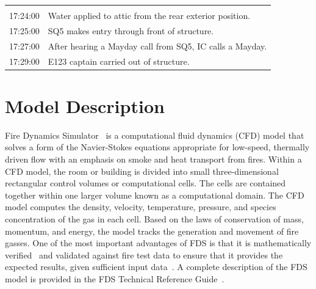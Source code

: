 \documentclass[12pt,oneside]{book}
\begin{document}
\begin{table}
\begin{tabular}{cl}
                           &                                                                                                                                          \\[.25cm]
17:24:00                   &   Water applied to attic from the rear exterior position.                                                                                \\[.25cm]
17:25:00                   &   SQ5 makes entry through front of structure.                                                                                            \\[.25cm]
17:27:00                   &   After hearing a Mayday call from SQ5, IC calls a Mayday.                                                                               \\[.25cm]
17:29:00                   &   E123 captain carried out of structure.                                                                                                 \\
\bottomrule[1.25pt]
\end{tabular}\par
\end{table}
 

\chapter{Model Description}
\label{model}
Fire Dynamics Simulator~\cite{FDS_Users_Guide} is a computational fluid dynamics (CFD) model that solves a form of the Navier-Stokes equations appropriate for low-speed, thermally driven flow with an emphasis on smoke and heat transport from fires.  Within a CFD model, the room or building is divided into small three-dimensional rectangular control volumes or computational cells.  The cells are contained together within one larger volume known as a computational domain.  The CFD model computes the density, velocity, temperature, pressure, and species concentration of the gas in each cell.  Based on the laws of conservation of mass, momentum,  and energy, the model tracks the generation and movement of fire gasses. One of the most important advantages of FDS is that it is  mathematically verified~\cite{FDS_Verification_Guide} and validated against fire test data to ensure that it provides the expected results, given sufficient input data~\cite{FDS_Validation_Guide}. A complete description of the FDS model is provided in the FDS Technical Reference Guide~\cite{FDS_Math_Guide}.
\end{document}
